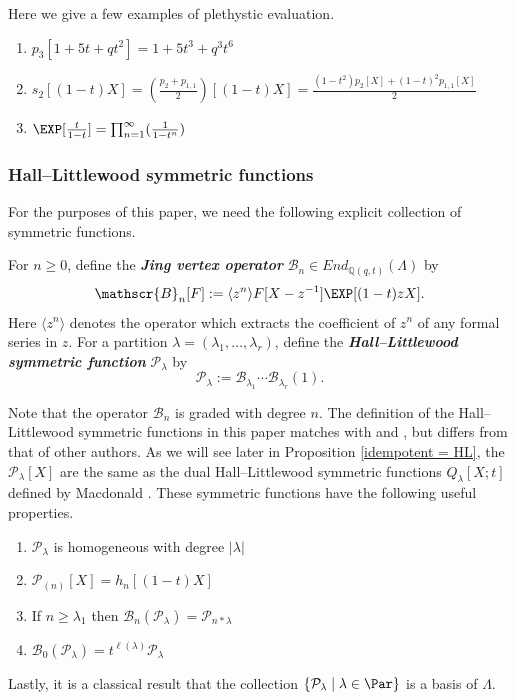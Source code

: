 \begin{exam}
Here we give a few examples of plethystic evaluation.
    \begin{enumerate}
        \item $p_3[1+5t+qt^2] = 1+5t^3 + q^3t^6$
        \item $s_{2}[(1-t)X] = (\frac{p_2+p_{1,1}}{2})[(1-t)X] = \frac{(1-t^2)p_2[X]+(1-t)^2p_{1,1}[X]}{2}$
        \item $\EXP[\frac{t}{1-t}]= \prod_{n=1}^{\infty}(\frac{1}{1-t^n})$
    \end{enumerate}
\end{exam}





\subsubsection{Hall--Littlewood symmetric functions}
For the purposes of this paper, we need the following explicit collection of symmetric functions.
\begin{defi}\label{Jing op defn}
    For $n \geq 0$, define the \textbf{\textit{Jing vertex operator}} $\mathscr{B}_n \in End_{\mathbb{Q}(q,t)}(\Lambda)$ by
    $$\mathscr{B}_n[F] : = \langle z^n \rangle F[X-z^{-1}]\EXP[(1-t)zX].$$
    Here $\langle z^n \rangle $ denotes the operator which extracts the coefficient of $z^n$ of any formal series in $z$. For a partition $\lambda = (\lambda_1,\ldots,\lambda_r)$, define the \textbf{\textit{Hall--Littlewood symmetric function}} $\mathcal{P}_{\lambda}$ by 
    $$\mathcal{P}_{\lambda}:= \mathscr{B}_{\lambda_1}\cdots \mathscr{B}_{\lambda_r}(1).$$
\end{defi}

Note that the operator $\mathscr{B}_n$ is graded with degree $n.$ The definition of the Hall--Littlewood symmetric functions in this paper matches with \cite{Ion_2022} and \cite{CM_2015}, but differs from that of other authors. As we will see later in Proposition \ref{idempotent = HL}, the $\mathcal{P}_{\lambda}[X]$ are the same as the dual Hall--Littlewood symmetric functions $Q_{\lambda}[X;t]$ defined by Macdonald \cite{Macdonald}. These symmetric functions have the following useful properties.
\begin{enumerate}
    \item $\mathcal{P}_{\lambda}$ is homogeneous with degree $|\lambda|$
    \item $\mathcal{P}_{(n)}[X] = h_{n}[(1-t)X]$
    \item If $n \geq \lambda_1$ then $\mathscr{B}_{n}(\mathcal{P}_{\lambda}) = \mathcal{P}_{n*\lambda}$
    \item $\mathscr{B}_{0}(\mathcal{P}_{\lambda}) = t^{\ell(\lambda)} \mathcal{P}_{\lambda}$
\end{enumerate}
Lastly, it is a classical result that the collection $\{\mathcal{P}_\lambda \mid \lambda \in \Par\}$ is a basis of $\Lambda$.

